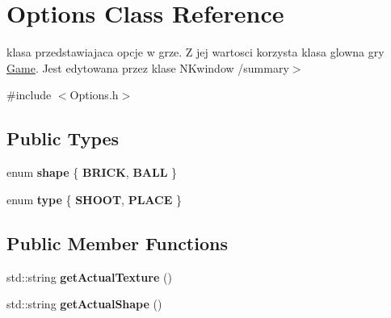 \hypertarget{class_options}{}\section{Options Class Reference}
\label{class_options}


klasa przedstawiajaca opcje w grze. Z jej wartosci korzysta klasa glowna gry \hyperlink{class_game}{Game}. Jest edytowana przez klase N\+Kwindow /summary$>$  




{\ttfamily \#include $<$Options.\+h$>$}

\subsection*{Public Types}
\begin{DoxyCompactItemize}
\item 
\mbox{\label{class_options_a0f3128a75a8707002955c2dc4b26b2ec}} 
enum {\bfseries shape} \{ {\bfseries B\+R\+I\+CK}, 
{\bfseries B\+A\+LL}
 \}
\item 
\mbox{\label{class_options_a1146a0adfa5192cf7fee8b6449615da6}} 
enum {\bfseries type} \{ {\bfseries S\+H\+O\+OT}, 
{\bfseries P\+L\+A\+CE}
 \}
\end{DoxyCompactItemize}
\subsection*{Public Member Functions}
\begin{DoxyCompactItemize}
\item 
\mbox{\label{class_options_aefd7611d75f212275fa9acd1b9ba7678}} 
std\+::string {\bfseries get\+Actual\+Texture} ()
\item 
\mbox{\label{class_options_a0391736b6fb81e736b43d2c85e9a6d30}} 
std\+::string {\bfseries get\+Actual\+Shape} ()
\end{DoxyCompactItemize}
